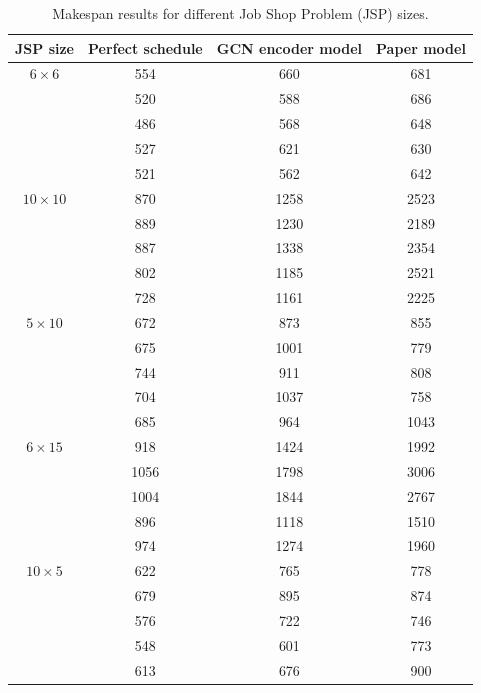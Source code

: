 \documentclass[12pt]{book}
\begin{document}
\begin{table}[htp]
\centering
\begin{tabular}{|c|c|c|c|}
\hline
JSP size & Perfect schedule & GCN encoder model & Paper model \\
\hline
$6\times6$ & 554 & 660 & 681 \\
\hline
& 520 & 588 & 686 \\
\hline
& 486 & 568 & 648 \\
\hline
& 527 & 621 & 630 \\
\hline
& 521 & 562 & 642 \\
\hline
$10\times10$ & 870 & 1258 & 2523 \\
\hline
& 889 & 1230 & 2189 \\
\hline
& 887 & 1338 & 2354 \\
\hline
& 802 & 1185 & 2521 \\
\hline
& 728 & 1161 & 2225 \\
\hline
$5\times10$ & 672 & 873 & 855 \\
\hline
& 675 & 1001 & 779 \\
\hline
& 744 & 911 & 808 \\
\hline
& 704 & 1037 & 758 \\
\hline
& 685 & 964 & 1043 \\
\hline
$6\times15$ & 918 & 1424 & 1992 \\
\hline
& 1056 & 1798 & 3006 \\
\hline
& 1004 & 1844 & 2767 \\
\hline
& 896 & 1118 & 1510 \\
\hline
& 974 & 1274 & 1960 \\
\hline
$10\times5$ & 622 & 765 & 778 \\
\hline
& 679 & 895 & 874 \\
\hline
& 576 & 722 & 746 \\
\hline
& 548 & 601 & 773 \\
\hline
& 613 & 676 & 900 \\
\hline
\end{tabular}
\caption{Makespan results for different Job Shop Problem (JSP) sizes.}
\label{tab:makespan_results}
\end{table}
\end{document}
